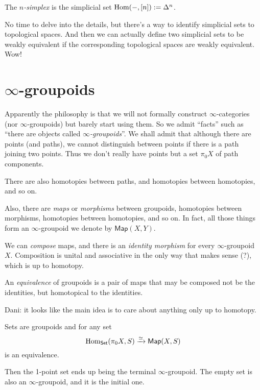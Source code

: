 \begin{definition}
\label{definition-simplex}
The {\it $n$-simplex} is the simplicial set $\mathop{\mathrm{Hom}}\nolimits(-,[n]):=\Delta^n$.
\end{definition}

No time to delve into the details, but there's a way to identify simplicial sets
to topological spaces. And then we can actually define two simplicial sets to be
weakly equivalent if the corresponding topological spaces are weakly equivalent.
Wow!

\section{$\infty$-groupoids}
\label{section-infty-groupoids}

Apparently the philosophy is that
we will not formally construct $\infty$-categories
(nor $\infty$-groupoids) but
barely start using them.
So we admit ``facts'' such as
``there are objects called {\it$\infty$-groupoids}''.
We shall admit that although there are points (and paths),
we cannot distinguish between points if there is
a path joining two points. Thus we don't really have points
but a set $\pi_0X$ of path components.

There are also homotopies between
paths, and homotopies between homotopies, and so on.

Also, there are {\it maps} or {\it morphisms} between groupoids,
homotopies between morphisms, homotopies between homotopies,
and so on. In fact, all those things form an $\infty$-groupoid
we denote by $\mathsf{Map}(X,Y)$.

We can {\it compose} maps, and there is
an {\it identity morphism} for every $\infty$-groupoid $X$.
Composition is unital and associative in the only
way that makes sense (?), which is up to homotopy.

\begin{definition}
\label{definition-equivalence}
An {\it equivalence} of groupoids is a pair of maps
that may be composed not be the identities,
but homotopical to the identities.
\end{definition}

Dani: it looks like the main idea
is to care about anything only up to homotopy.

\medskip\noindent
Sets are groupoids and for any set
$$
\mathop{\mathrm{Hom}}\nolimits_{\mathsf{Set}}(\pi_0X,S)\xrightarrow{\simeq }\mathsf{Map}(X,S)
$$
is an equivalence.

Then the 1-point set ends up being
the terminal $\infty$-groupoid. The empty set
is also an $\infty$-groupoid, and it is
the initial one.

